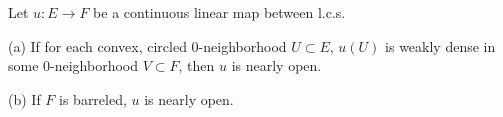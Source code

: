 Let $u: E \to F$ be a continuous linear map between l.c.s.

(a) If for each convex, circled 0-neighborhood $U \subset E$, $u(U)$ is weakly dense in some 0-neighborhood $V \subset F$, then $u$ is nearly open.

(b) If $F$ is barreled, $u$ is nearly open.
